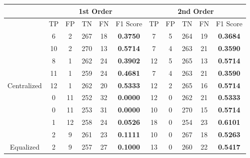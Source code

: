 \documentclass[10pt,a4paper]{article}
\begin{document}
		\begin{table}[!h]
			\centering
			\begin{tabular}{|c|c|c|c|c|c|c|c|c|c|c|}
				\hline
				& \multicolumn{5}{c|}{1st Order}                                                     & \multicolumn{5}{c|}{2nd Order}                              \\ \hline
				& TP & FP & TN  & FN                        & F1 Score                               & TP & FP & TN  & FN & F1 Score                               \\ \hline
				& 6  & 2  & 267 & {\color[HTML]{333333} 18} & {\color[HTML]{FE0000} \textbf{0.3750}} & 7  & 5  & 264 & 19 & {\color[HTML]{FE0000} \textbf{0.3684}} \\ \cline{2-11} 
				& 10 & 2  & 270 & {\color[HTML]{333333} 13} & {\color[HTML]{FE0000} \textbf{0.5714}} & 7  & 4  & 263 & 21 & {\color[HTML]{FE0000} \textbf{0.3590}} \\ \cline{2-11} 
				& 8  & 1  & 262 & {\color[HTML]{333333} 24} & {\color[HTML]{FE0000} \textbf{0.3902}} & 12 & 5  & 265 & 13 & {\color[HTML]{FE0000} \textbf{0.5714}} \\ \cline{2-11} 
				& 11 & 1  & 259 & {\color[HTML]{333333} 24} & {\color[HTML]{FE0000} \textbf{0.4681}} & 7  & 4  & 263 & 21 & {\color[HTML]{FE0000} \textbf{0.3590}} \\ \cline{2-11} 
				\multirow{-5}{*}{Centralized} & 12 & 1  & 262 & {\color[HTML]{333333} 20} & {\color[HTML]{FE0000} \textbf{0.5333}} & 12 & 2  & 265 & 16 & {\color[HTML]{FE0000} \textbf{0.5714}} \\ \hline
				& 0  & 11 & 252 & {\color[HTML]{333333} 32} & {\color[HTML]{FE0000} \textbf{0.0000}} & 12 & 0  & 262 & 21 & {\color[HTML]{FE0000} \textbf{0.5333}} \\ \cline{2-11} 
				& 0  & 11 & 253 & {\color[HTML]{333333} 31} & {\color[HTML]{FE0000} \textbf{0.0000}} & 10 & 0  & 270 & 15 & {\color[HTML]{FE0000} \textbf{0.5714}} \\ \cline{2-11} 
				& 1  & 12 & 258 & {\color[HTML]{333333} 24} & {\color[HTML]{FE0000} \textbf{0.0526}} & 18 & 0  & 254 & 23 & {\color[HTML]{FE0000} \textbf{0.6101}} \\ \cline{2-11} 
				& 2  & 9  & 261 & {\color[HTML]{333333} 23} & {\color[HTML]{FE0000} \textbf{0.1111}} & 10 & 0  & 267 & 18 & {\color[HTML]{FE0000} \textbf{0.5263}} \\ \cline{2-11} 
				\multirow{-5}{*}{Equalized}   & 2  & 9  & 257 & {\color[HTML]{333333} 27} & {\color[HTML]{FE0000} \textbf{0.1000}} & 13 & 0  & 260 & 22 & {\color[HTML]{FE0000} \textbf{0.5417}} \\ \hline
			\end{tabular}
		\end{table}
	
\end{document}
